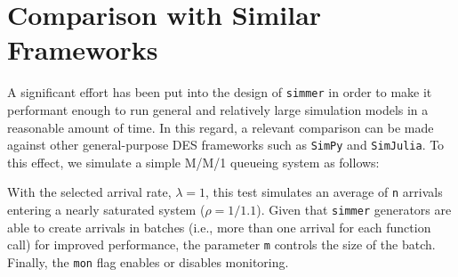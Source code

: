 \documentclass[twoside,nohyper]{tufte-book}
\newenvironment{Shaded}{}{}
\newcommand{\ControlFlowTok}[1]{\textcolor[rgb]{0.00,0.44,0.13}{\textbf{#1}}}
\newcommand{\DataTypeTok}[1]{\textcolor[rgb]{0.56,0.13,0.00}{#1}}
\newcommand{\DecValTok}[1]{\textcolor[rgb]{0.25,0.63,0.44}{#1}}
\newcommand{\FloatTok}[1]{\textcolor[rgb]{0.25,0.63,0.44}{#1}}
\newcommand{\KeywordTok}[1]{\textcolor[rgb]{0.00,0.44,0.13}{\textbf{#1}}}
\newcommand{\NormalTok}[1]{#1}
\newcommand{\OperatorTok}[1]{\textcolor[rgb]{0.40,0.40,0.40}{#1}}
\newcommand{\OtherTok}[1]{\textcolor[rgb]{0.00,0.44,0.13}{#1}}
\newcommand{\StringTok}[1]{\textcolor[rgb]{0.25,0.44,0.63}{#1}}
\begin{document}
\hypertarget{comparison-with-similar-frameworks}{%
\section{Comparison with Similar Frameworks}\label{comparison-with-similar-frameworks}}

A significant effort has been put into the design of \texttt{simmer} in order to make it performant enough to run general and relatively large simulation models in a reasonable amount of time. In this regard, a relevant comparison can be made against other general-purpose DES frameworks such as \texttt{SimPy} and \texttt{SimJulia}. To this effect, we simulate a simple M/M/1 queueing system as follows:

\begin{Shaded}
\end{Shaded}

With the selected arrival rate, \(\lambda=1\), this test simulates an average of \texttt{n} arrivals entering a nearly saturated system (\(\rho=1/1.1\)). Given that \texttt{simmer} generators are able to create arrivals in batches (i.e., more than one arrival for each function call) for improved performance, the parameter \texttt{m} controls the size of the batch. Finally, the \texttt{mon} flag enables or disables monitoring.
\end{document}

